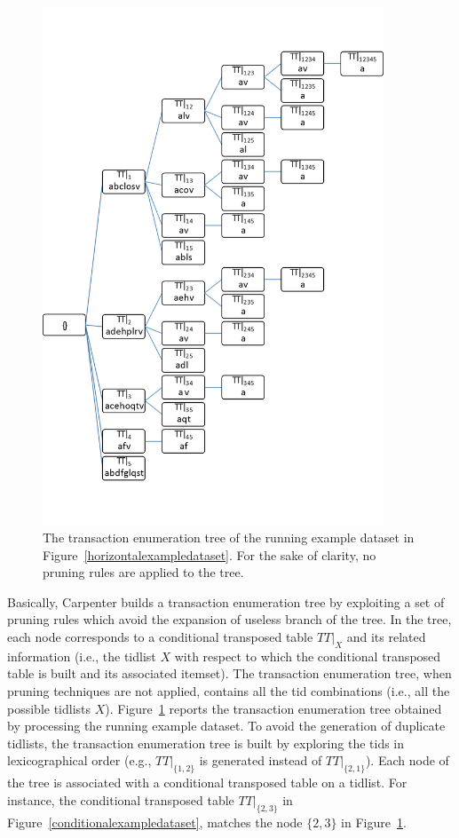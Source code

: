 \begin{figure}[!t]
\includegraphics[width=4in]{chapters/pampa/running_example1.png}
\caption{The transaction enumeration tree of the running example dataset in
Figure~\ref{horizontalexampledataset}. For the sake of clarity, no pruning rules
are applied to the tree.}
\label{running_1}
\end{figure}

Basically, Carpenter builds a transaction enumeration tree by exploiting a set of pruning rules
which avoid the expansion of useless branch of the tree. 
In the tree, each node corresponds to a
conditional transposed table $TT|_X$ and its related information (i.e., the
tidlist $X$ with respect to which the conditional transposed table is built and
its associated itemset).
The transaction enumeration tree, when pruning techniques are not applied,
contains all the tid combinations (i.e., all the possible
tidlists $X$).
Figure~\ref{running_1} reports the
transaction enumeration tree obtained by processing the running example dataset.
To avoid the generation of duplicate
tidlists, the transaction enumeration tree is built by exploring the tids in
lexicographical order (e.g., $TT|_{\{1,2\}}$ is generated instead of
$TT|_{\{2,1\}}$).
Each node of the tree is associated with a conditional transposed table on a
tidlist.
For instance, the conditional transposed table
$TT|_{\{2,3\}}$ in Figure~\ref{conditionalexampledataset}, matches the node
$\{2,3\}$ in Figure~\ref{running_1}.


